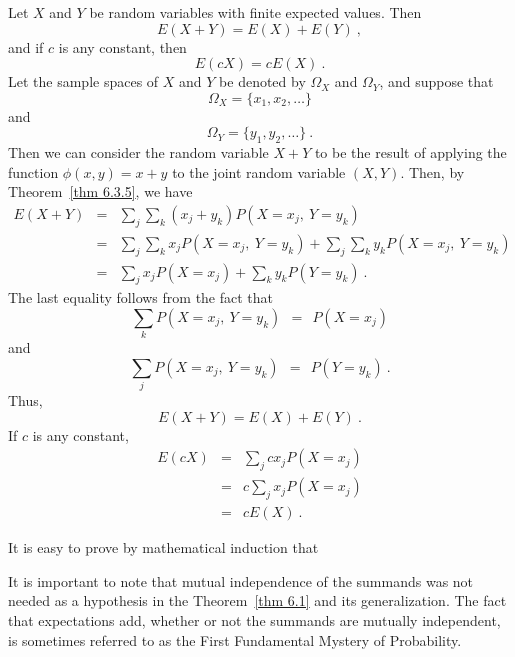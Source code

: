 \begin{theorem}\label{thm 6.1} Let $X$ and $Y$ be random variables with finite
expected values.  Then
$$ E(X + Y) = E(X) + E(Y)\ ,
$$ and if $c$ is any constant, then
$$ E(cX) = cE(X)\ .
$$
\proof Let the sample spaces of $X$ and $Y$ be denoted by $\Omega_X$ and $\Omega_Y$,
and suppose that
$$\Omega_X = \{x_1, x_2, \ldots\}$$ and
$$\Omega_Y = \{y_1, y_2, \ldots\}\ .$$ Then we can consider the random variable $X +
Y$ to be the result of applying the  function $\phi(x, y) = x + y$ to the joint
random variable $(X,Y)$.  Then, by Theorem~\ref{thm 6.3.5}, we have
\begin{eqnarray*} E(X+Y) & = &\sum_j \sum_k (x_j + y_k) P(X = x_j,\ Y = y_k) \\
       & = &\sum_j \sum_k x_j P(X = x_j,\ Y = y_k) +
\sum_j \sum_k y_k P(X = x_j,\ Y = y_k) \\ & = &\sum_j x_j P(X = x_j) + \sum_k y_k P(Y
= y_k)\ .
\end{eqnarray*} The last equality follows from the fact that
$$\sum_k P(X = x_j,\ Y = y_k)\ \  =\ \  P(X = x_j)$$ and
$$\sum_j P(X = x_j,\ Y = y_k)\ \  =\ \  P(Y = y_k)\ .$$ Thus,
$$E(X+Y) = E(X) + E(Y)\ .$$ If $c$ is any constant,
\begin{eqnarray*}  E(cX) & = & \sum_j cx_j P(X = x_j) \\
      & = & c\sum_j x_j P(X = x_j)\\
      & = & cE(X)\ .
\end{eqnarray*}
\end{theorem}
It is easy to prove by mathematical induction that  
\par It is important to note that mutual independence of the summands was not needed
as a hypothesis in the Theorem~\ref{thm 6.1} and its generalization.  The fact that
expectations add, whether or not the summands are mutually independent, is sometimes
referred to as the First Fundamental Mystery of Probability.

